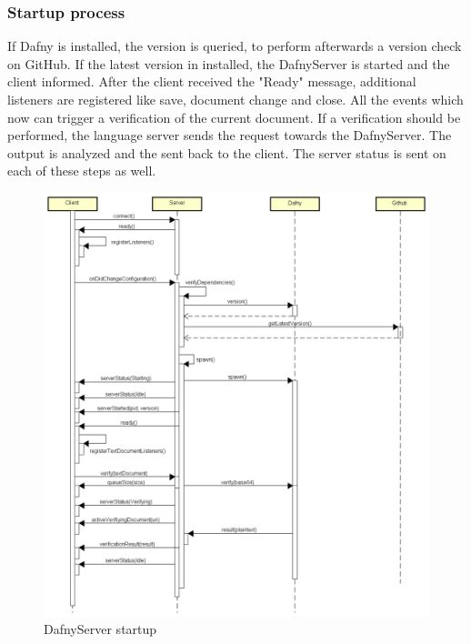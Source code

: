 \subsubsection{Startup process}
If Dafny is installed, the version is queried, to perform afterwards a version check on GitHub. If the latest version in installed, the DafnyServer is started and the client informed. After the client received the "Ready" message, additional listeners are registered like save, document change and close. All the events which now can trigger a verification of the current document. If a verification should be performed, the language server sends the request towards the DafnyServer. The output is analyzed and the sent back to the client. The server status is sent on each of these steps as well.    
\begin{figure}[H]
	\centering
	\includegraphics[width=1\textwidth]{img/DafnyStartupFull}
	\caption{DafnyServer startup}
	\label{fig:DafnyServer startup}
\end{figure}

